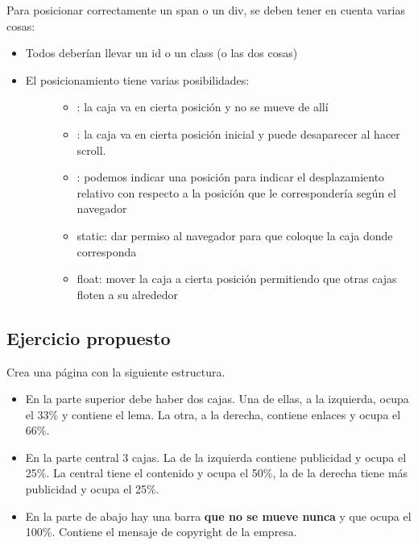\documentclass[letterpaper,10pt,spanish]{sphinxmanual}
\begin{document}
Para posicionar correctamente un span o un div, se deben tener en cuenta
varias cosas:
\begin{itemize}
\item {} 
Todos deberían llevar un id o un class (o las dos cosas)

\item {} \begin{description}
\item[{El posicionamiento tiene varias posibilidades:}] \leavevmode\begin{itemize}
\item {} 
: la caja va en cierta posición y no se mueve de allí

\item {} 
: la caja va en cierta posición inicial y puede desaparecer al hacer scroll.

\item {} 
: podemos indicar una posición para indicar el desplazamiento relativo con respecto a la posición que le correspondería según el navegador

\item {} 
static: dar permiso al navegador para que coloque la caja donde corresponda

\item {} 
float: mover la caja a cierta posición permitiendo que otras cajas floten a su alrededor

\end{itemize}

\end{description}

\end{itemize}


\subsection{Ejercicio propuesto}
\label{tema3:ejercicio-propuesto}
Crea una página con la siguiente estructura.
\begin{itemize}
\item {} 
En la parte superior debe haber dos cajas. Una de ellas, a la izquierda, ocupa el 33\% y contiene el lema. La otra, a la derecha, contiene enlaces y ocupa el 66\%.

\item {} 
En la parte central 3 cajas. La de la izquierda contiene publicidad y ocupa el 25\%. La central tiene el contenido y ocupa el 50\%, la de la derecha tiene más publicidad y ocupa el 25\%.

\item {} 
En la parte de abajo hay una barra \textbf{que no se mueve nunca} y que ocupa el 100\%. Contiene el mensaje de copyright de la empresa.

\end{itemize}
\end{document}
